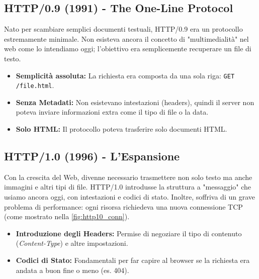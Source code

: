 \documentclass[11pt,a4paper]{report}
\begin{document}
\subsection{HTTP/0.9 (1991) - The One-Line Protocol}
Nato per scambiare semplici documenti testuali, HTTP/0.9 era un protocollo estremamente minimale. Non esisteva ancora il concetto di "multimedialità" nel web come lo intendiamo oggi; l'obiettivo era semplicemente recuperare un file di testo.

\begin{itemize}
    \item \textbf{Semplicità assoluta:} La richiesta era composta da una sola riga: \texttt{GET /file.html}.
    \item \textbf{Senza Metadati:} Non esistevano intestazioni (headers), quindi il server non poteva inviare informazioni extra come il tipo di file o la data.
    \item \textbf{Solo HTML:} Il protocollo poteva trasferire solo documenti HTML.
\end{itemize}

\subsection{HTTP/1.0 (1996) - L'Espansione}
Con la crescita del Web, divenne necessario trasmettere non solo testo ma anche immagini e altri tipi di file. HTTP/1.0 introdusse la struttura a "messaggio" che usiamo ancora oggi, con intestazioni e codici di stato. Inoltre, soffriva di un grave problema di performance: ogni risorsa richiedeva una nuova connessione TCP (come mostrato nella \cref{fig:http10_conn}).

\begin{itemize}
    \item \textbf{Introduzione degli Headers:} Permise di negoziare il tipo di contenuto (\textit{Content-Type}) e altre impostazioni.
    \item \textbf{Codici di Stato:} Fondamentali per far capire al browser se la richiesta era andata a buon fine o meno (es. 404).
\end{itemize}
\end{document}
